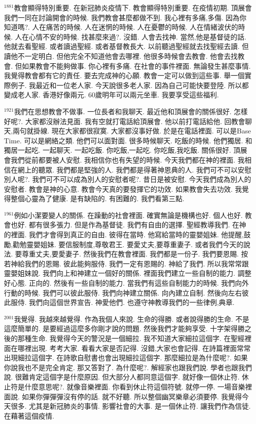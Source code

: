 \documentclass{book}
\begin{document}
$^{1881}$教會顯得特別重要.
在新冠肺炎疫情下.
教會顯得特別重要.
在疫情初期.
頂展會我們一同在討論開會的時候.
我們教會甚麼都做不到.
我心裡有多痛,多傷.
因為你知道嗎?.
人在痛苦的時候.
人在迷惘的時候.
人在憂鬱的時候.
人在情緒波伏的時候.
人在心情不安的時候.
找甚麼來過?.
沒錯.
人會去找神.
當然,他是基督徒的話.
他就去看聖經.
或者讀過聖經.
或者基督教長大.
以前聽過聖經就去找聖經去讀.
但讀他不一定明白.
但他完全不知道他會去哪裡.
他很多時候會去教會.
他會去找教會.
但如果教會不能夠做事.
你心裡有多痛.
在社會的事件裡面.
無論發生甚麼事情.
我覺得教會都有它的責任.
要去完成神的心願.
教會一定可以做到這些事.
舉一個實際例子.
我最近和一位老人家.
今天說很多老人家.
因為自己可能快要登陸.
所以都變成老人家.
香港好像兩元.
60歲明年可以兩元坐車.
我要享受這些福利.

$^{1921}$我們在思想教會不做事.
一位長者和我聊天.
最近他和頂展會的關係很好.
怎樣好呢?.
大家都沒辦法見面.
我有空就打電話給頂展會.
他以前打電話給他.
回教會聊天,兩句就掛線.
現在大家都很寂寞.
大家都沒事好做.
於是在電話裡面.
可以是Base Time.
可以是網絡之類.
他們可以面對面.
很多時候聊天.
吃飯的時候.
他們獨居.
和獨居一起吃.
一起聊天.
一起吃飯.
你吃飯,一起吃.
你吃飯,我吃飯.
關係很好.
頂展會我們從前都要被人安慰.
我相信你也有失望的時候.
今天我們都在神的裡面.
我相信在網上的聽眾.
我們都是堅強的人.
我們都是得著神恩典的人.
我們可不可以安慰別人呢?.
我們可不可以成為別人的安慰者呢?.
昔日是被安慰.
今天我們成為別人的安慰者.
教會是神的心意.
教會今天真的要發揮它的功效.
如果教會失去功效.
我覺得整個心靈為了健康.
是有缺陷的.
有困難的.
我們看第三點.

$^{1961}$例如小潔要變人的關係.
在躁動的社會裡面.
確實無論是機構也好.
個人也好.
教會也好.
都有很多張力.
但是作為基督徒.
我們有自由的選擇.
聖經教導我們.
在神的裡面.
我們才會得到真正的自由.
彼得在當時.
他寫給當時的靈嬰姐妹.
他提醒,鼓勵,勸勉靈嬰姐妹.
要信服制度,尊敬君王.
要愛丈夫,要尊重妻子.
或者我們今天的說法.
要尊重丈夫,要愛妻子.
然後我們在教會裡面.
我們都是一份子.
我們要恩賜.
按若神給我們的恩賜.
彼此能夠服侍.
我們一定有恩賜的.
神給了我們.
所以我常常跟靈嬰姐妹說.
我們向上和神建立一個好的關係.
裡面我們建立一些自制的能力.
調整好心態.
正向的.
然後有一些自制的能力.
當我們有這些自制能力的時候.
我們向外行動的時候.
我們可以彼此服侍.
我們向神建立關係.
向內建立自制.
然後向左右彼此服侍.
我們向這個世界宣告.
神愛他們.
也遵守神教導我們的一些律例,典章.

$^{2001}$我覺得.
我越來越覺得.
作為我個人來說.
生命的得勝.
或者說得勝的生命.
不是這麼簡單的.
是要經過這麼多你剛才說的問題.
然後我們才能夠享受.
十字架得勝之後的那種生命.
我覺得今天的警況是一個細拉.
我不知道大家細拉這個字.
在聖經裡面在哪裡出現.
考考大家.
看看大家是否記得.
沒錯,大家也會記得.
在詩篇裡面常常出現細拉這個字.
在詩歌自慰書也會出現細拉這個字.
那麼細拉是為什麼呢?.
如果你說我也不是完全肯定.
那又答對了.
為什麼呢?.
解經家也跟我們說.
學者也跟我們說.
很難肯定這個字是什麼原因.
但大部分人都同意這個字.
就好像一個休止符.
休止符是什麼意思呢?.
就像音樂裡面.
你看到休止符這個符號.
就停一停.
一場音樂裡面說.
如果你彈彈彈沒有停的話.
就不好聽.
所以整個幽冥樂章必須要停.
我覺得今天很多.
尤其是新冠肺炎的事情.
影響社會的大事.
是一個休止符.
讓我們作為信徒.
在藉著這個疫情.
\end{document}
